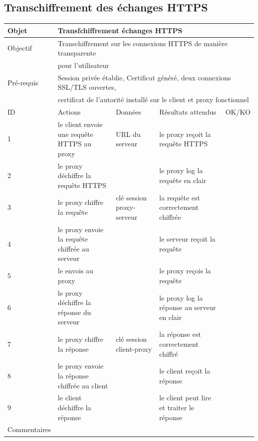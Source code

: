 \documentclass[a4paper,11pt,french]{article}
\begin{document}
\newpage


\subsection{Transchiffrement des échanges HTTPS}

\begin{tabular}{|m{2.5cm}|m{4cm}|m{3cm}|m{3.5cm}|m{2cm}|}
\hline 
\rowcolor{Blue} Objet & \multicolumn{4}{|l|}{Transfchiffrement échanges HTTPS} \\ 
\hline 
\rowcolor{Blue} Objectif & \multicolumn{4}{|l|}{Transchiffrement sur les connexions HTTPS de manière transparente} \\
\rowcolor{Blue} & \multicolumn{4}{|l|}{pour l'utilisateur} \\ 
\hline 
\rowcolor{Blue} Pré-requis & \multicolumn{4}{|l|}{Session privée établie, Certificat généré, deux connexions SSL/TLS ouvertes,} \\ 
\rowcolor{Blue} & \multicolumn{4}{|l|}{certificat de l'autorité installé sur le client et proxy fonctionnel} 
\\
\hline 
\rowcolor{Orange} ID & Actions & Données & Résultats attendus & OK/KO \\ 
\hline 
1 & le client envoie une requête HTTPS au proxy & URL du serveur & le proxy reçoit la requête HTTPS &  \\ 
\hline
2 & le proxy déchiffre la requête HTTPS & & le proxy log la requête en clair & \\
\hline
3 & le proxy chiffre la requête & clé session proxy-serveur & la requête est 
correctement chiffrée & \\
\hline
4 & le proxy envoie la requête chiffrée au serveur & & le serveur reçoit la requête & \\
\hline
5 & le envois au proxy & & le proxy reçois la 
requête & \\
\hline
6 & le proxy déchiffre la réponse du serveur & & le proxy log la réponse au 
serveur en clair & \\
\hline
7 & le proxy chiffre la réponse & clé session client-proxy & la réponse est 
correctement chiffré & \\
\hline
8 & le proxy envoie la réponse chiffrée au client & & le client reçoit la réponse 
& \\
\hline
9 & le client déchiffre la réponse & & le client peut lire et traiter le réponse 
& \\
\hline
Commentaires & \multicolumn{4}{|l|}{} \\ 
\hline
\end{tabular}

\newpage
\end{document}
